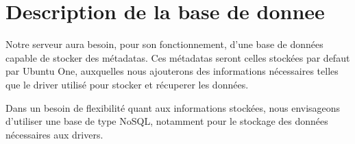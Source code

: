 \section{Description de la base de donnee}
Notre serveur aura besoin, pour son fonctionnement, d'une base de données capable de stocker des métadatas.
Ces métadatas seront celles stockées par defaut par Ubuntu One, auxquelles nous ajouterons des informations nécessaires telles que le driver utilisé pour stocker et récuperer les données.

Dans un besoin de flexibilité quant aux informations stockées, nous envisageons d'utiliser une base de type NoSQL, notamment pour le stockage des données nécessaires aux drivers.
